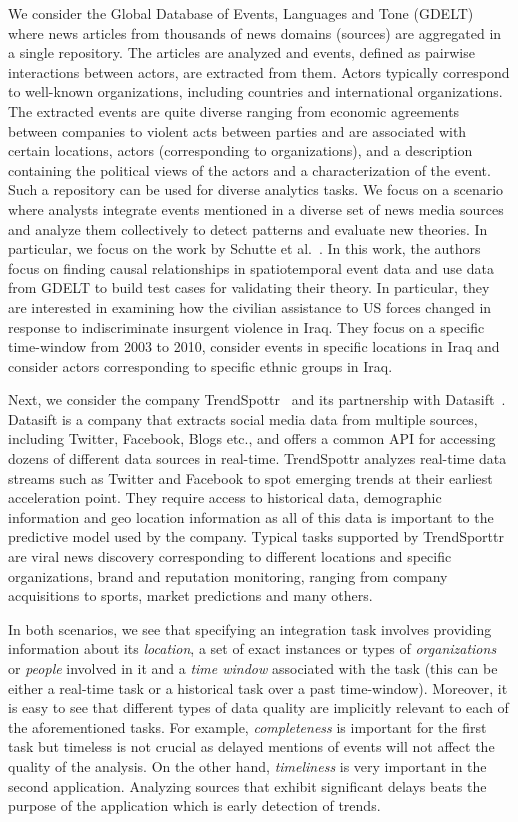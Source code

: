 \documentclass{sig-alternate}
\begin{document}
We consider the Global Database of Events, Languages and Tone (GDELT)~\cite{leetaru:2013} where news articles from thousands of news domains (sources) are aggregated in a single repository. The articles are analyzed and events, defined as pairwise interactions between actors, are extracted from them. Actors typically correspond to well-known organizations, including countries and international organizations. The extracted events are quite diverse ranging from economic agreements between companies to violent acts between parties and are associated with certain locations, actors (corresponding to organizations), and a description containing the political views of the actors and a characterization of the event. Such a repository can be used for diverse analytics tasks. We focus on a scenario where analysts integrate events mentioned in a diverse set of news media sources and analyze them collectively to detect patterns and evaluate new theories. In particular, we focus on the work by Schutte et al.~\cite{schutte:2014}. In this work, the authors focus on finding causal relationships in spatiotemporal event data and use data from GDELT to build test cases for validating their theory. In particular, they are interested in examining how the civilian assistance to US forces changed in response to indiscriminate insurgent violence in Iraq. They focus on a specific time-window from 2003 to 2010, consider events in specific locations in Iraq and consider actors corresponding to specific ethnic groups in Iraq.

Next, we consider the company TrendSpottr~\cite{trendspottr} and its partnership with Datasift~\cite{datasift}. Datasift is a company that extracts social media data from multiple sources, including Twitter, Facebook, Blogs etc., and offers a common API for accessing dozens of different data sources in real-time. TrendSpottr analyzes real-time data streams such as Twitter and Facebook to spot emerging trends at their earliest acceleration point. They require access to historical data, demographic information and geo location information as all of this data is important to the predictive model used by the company. Typical tasks supported by TrendSporttr are viral news discovery corresponding to different locations and specific organizations, brand and reputation monitoring, ranging from company acquisitions to sports,  market predictions and many others. 

In both scenarios, we see that specifying an integration task involves providing information about its {\em location}, a set of exact instances or types of {\em organizations} or {\em people} involved in it and a {\em time window} associated with the task (this can be either a real-time task or a historical task over a past time-window). Moreover, it is easy to see that different types of data quality are implicitly relevant to each of the aforementioned tasks. For example, {\em completeness} is important for the first task but timeless is not crucial as delayed mentions of events will not affect the quality of the analysis. On the other hand, {\em timeliness} is very important in the second application. Analyzing sources that exhibit significant delays beats the purpose of the application which is early detection of trends. 
\end{document}
